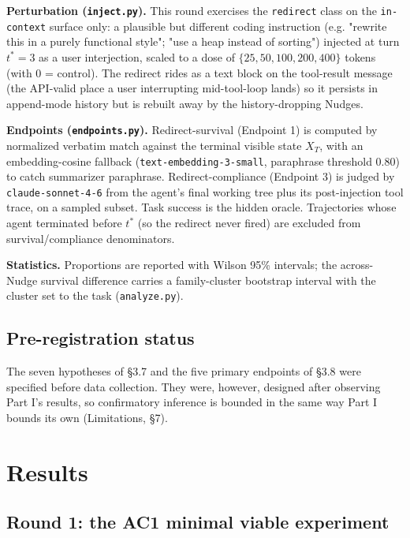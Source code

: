 \documentclass{article}
\theoremstyle{plain}
\theoremstyle{definition}
\begin{document}
\textbf{Perturbation (\texttt{inject.py}).} This round exercises the \texttt{redirect} class on the \texttt{in-context} surface only: a plausible but different coding instruction (e.g. "rewrite this in a purely functional style"; "use a heap instead of sorting") injected at turn $t^*=3$ as a user interjection, scaled to a dose of $\{25, 50, 100, 200, 400\}$ tokens (with $0$ = control). The redirect rides as a text block on the tool-result message (the API-valid place a user interrupting mid-tool-loop lands) so it persists in append-mode history but is rebuilt away by the history-dropping Nudges.

\textbf{Endpoints (\texttt{endpoints.py}).} Redirect-survival (Endpoint 1) is computed by normalized verbatim match against the terminal visible state $X_T$, with an embedding-cosine fallback (\texttt{text-embedding-3-small}, paraphrase threshold $0.80$) to catch summarizer paraphrase. Redirect-compliance (Endpoint 3) is judged by \texttt{claude-sonnet-4-6} from the agent's final working tree plus its post-injection tool trace, on a sampled subset. Task success is the hidden oracle. Trajectories whose agent terminated before $t^*$ (so the redirect never fired) are excluded from survival/compliance denominators.

\textbf{Statistics.} Proportions are reported with Wilson 95\% intervals; the across-Nudge survival difference carries a family-cluster bootstrap interval with the cluster set to the task (\texttt{analyze.py}).

\subsection{Pre-registration status}

The seven hypotheses of §3.7 and the five primary endpoints of §3.8 were specified before data collection. They were, however, designed after observing Part I's results, so confirmatory inference is bounded in the same way Part I bounds its own (Limitations, §7).


\section{Results}

\subsection{Round 1: the AC1 minimal viable experiment}
\end{document}

